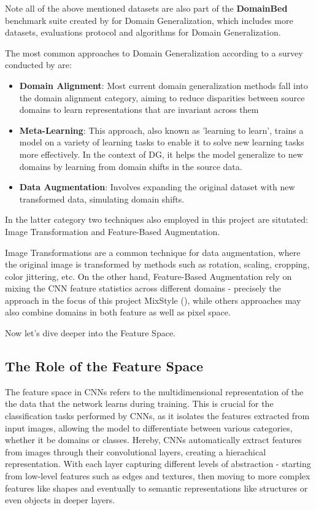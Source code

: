 Note all of the above mentioned datasets are also part of the \textbf{DomainBed} benchmark suite created by \cite{gulrajaniSearchLostDomain2020} for Domain Generalization, which includes more datasets, evaluations protocol and algorithms for Domain Generalization.

The most common approaches to Domain Generalization according to a survey conducted by \cite{zhouDomainGeneralizationSurvey2022} are: %
\begin{itemize}
 \item \textbf{Domain Alignment}: Most current domain generalization methods fall into the domain alignment category, aiming to reduce disparities between source domains to learn representations that are invariant across them
 \item \textbf{Meta-Learning}: This approach, also known as 'learning to learn', trains a model on a variety of learning tasks to enable it to solve new learning tasks more effectively. In the context of DG, it helps the model generalize to new domains by learning from domain shifts in the source data.
 \item \textbf{Data Augmentation}: Involves expanding the original dataset with new transformed data, simulating domain shifts.
\end{itemize}

In the latter category two techniques also employed in this project are situtated:
Image Transformation and Feature-Based Augmentation.

Image Transformations are a common technique for data augmentation, where the original image is transformed by methods such as rotation, scaling, cropping, color jittering, etc.
On the other hand, Feature-Based Augmentation rely on mixing the CNN feature statistics across different domains - precisely the approach in the focus of this project MixStyle (\cite{zhouMixStyleNeuralNetworks2023}), while others approaches may also combine domains in both feature as well as pixel space.

Now let's dive deeper into the Feature Space.
\subsection{The Role of the Feature Space}
The feature space in CNNs refers to the multidimensional representation of the the data that the network learns during training. This is crucial for the classification tasks performed by CNNs, as it isolates the features extracted from input images, allowing the model to differentiate between various categories, whether it be domains or classes.
Hereby, CNNs automatically extract features from images through their convolutional layers, creating a hierachical representation. With each layer capturing different levels of abstraction - starting from low-level features such as edges and textures, then moving to more complex features like shapes and eventually to semantic representations like structures or even objects in deeper layers. \cite{zeilerVisualizingUnderstandingConvolutional2013,goodfellowDeepLearning2016}

